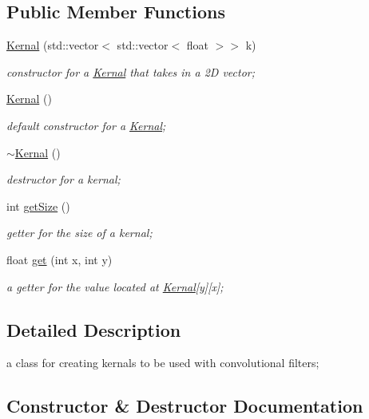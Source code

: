 \subsection*{Public Member Functions}
\begin{DoxyCompactItemize}
\item 
\hyperlink{classKernal_a6c583be3479e032ae54f74168098da5d}{Kernal} (std\+::vector$<$ std\+::vector$<$ float $>$$>$ k)
\begin{DoxyCompactList}\small\item\em constructor for a \hyperlink{classKernal}{Kernal} that takes in a 2D vector; \end{DoxyCompactList}\item 
\hyperlink{classKernal_a6b9b76d7863d4984485ed34cb492f12c}{Kernal} ()
\begin{DoxyCompactList}\small\item\em default constructor for a \hyperlink{classKernal}{Kernal}; \end{DoxyCompactList}\item 
\hyperlink{classKernal_aab6e0d2f014ad2f828bbbd8236cdeedc}{$\sim$\+Kernal} ()
\begin{DoxyCompactList}\small\item\em destructor for a kernal; \end{DoxyCompactList}\item 
int \hyperlink{classKernal_a0767772b0bf3f7eacb910fcd9ae1bfcc}{get\+Size} ()
\begin{DoxyCompactList}\small\item\em getter for the size of a kernal; \end{DoxyCompactList}\item 
float \hyperlink{classKernal_a4dfa813ba722fa66f40fb89443b23561}{get} (int x, int y)
\begin{DoxyCompactList}\small\item\em a getter for the value located at \hyperlink{classKernal}{Kernal}\mbox{[}y\mbox{]}\mbox{[}x\mbox{]}; \end{DoxyCompactList}\end{DoxyCompactItemize}


\subsection{Detailed Description}
a class for creating kernals to be used with convolutional filters; 

\subsection{Constructor \& Destructor Documentation}
\mbox{\label{classKernal_a6c583be3479e032ae54f74168098da5d}} 
